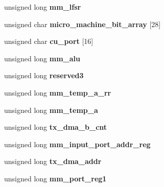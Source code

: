 \begin{DoxyCompactItemize}
unsigned long {\bfseries mm\+\_\+lfsr}
\item 
\mbox{\label{structi596__dump__result_af5d9a8636084d5f34196619bc5e29a3a}} 
unsigned char {\bfseries micro\+\_\+machine\+\_\+bit\+\_\+array} \mbox{[}28\mbox{]}
\item 
\mbox{\label{structi596__dump__result_af48475551f242cd1c53797e0cc18ded3}} 
unsigned char {\bfseries cu\+\_\+port} \mbox{[}16\mbox{]}
\item 
\mbox{\label{structi596__dump__result_aa055e3a6e4319d11868c976542fced56}} 
unsigned long {\bfseries mm\+\_\+alu}
\item 
\mbox{\label{structi596__dump__result_aa9c3104767978e9f8086f6515cf866b8}} 
unsigned long {\bfseries reserved3}
\item 
\mbox{\label{structi596__dump__result_a54e724d312eea92bb4a8d858e7f3d303}} 
unsigned long {\bfseries mm\+\_\+temp\+\_\+a\+\_\+rr}
\item 
\mbox{\label{structi596__dump__result_a6cc6f792dd0befdc4828036cfbce67b0}} 
unsigned long {\bfseries mm\+\_\+temp\+\_\+a}
\item 
\mbox{\label{structi596__dump__result_afe8e80b74ed5d06de25a99da0ed38480}} 
unsigned long {\bfseries tx\+\_\+dma\+\_\+b\+\_\+cnt}
\item 
\mbox{\label{structi596__dump__result_ad6ebb21492ccc6ebab9f5f2286b965f4}} 
unsigned long {\bfseries mm\+\_\+input\+\_\+port\+\_\+addr\+\_\+reg}
\item 
\mbox{\label{structi596__dump__result_a4d62d1fd34f0472774810480a4f1fc33}} 
unsigned long {\bfseries tx\+\_\+dma\+\_\+addr}
\item 
\mbox{\label{structi596__dump__result_a98289e54ca21faaf79ae0d34506bab51}} 
unsigned long {\bfseries mm\+\_\+port\+\_\+reg1}
\item 
\mbox{\label{structi596__dump__result_a6bc0cafe9c139e24e0928bed20d0f8f9}} 

\end{DoxyCompactItemize}
